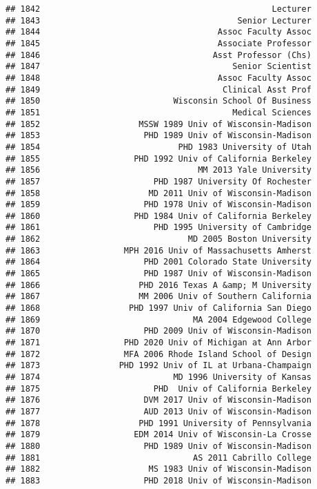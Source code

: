 \documentclass[
]{article}
\begin{document}
\begin{verbatim}
## 1842                                               Lecturer
## 1843                                        Senior Lecturer
## 1844                                    Assoc Faculty Assoc
## 1845                                    Associate Professor
## 1846                                   Asst Professor (Chs)
## 1847                                       Senior Scientist
## 1848                                    Assoc Faculty Assoc
## 1849                                     Clinical Asst Prof
## 1850                           Wisconsin School Of Business
## 1851                                       Medical Sciences
## 1852                    MSSW 1989 Univ of Wisconsin-Madison
## 1853                     PHD 1989 Univ of Wisconsin-Madison
## 1854                            PHD 1983 University of Utah
## 1855                   PHD 1992 Univ of California Berkeley
## 1856                                MM 2013 Yale University
## 1857                       PHD 1987 University Of Rochester
## 1858                      MD 2011 Univ of Wisconsin-Madison
## 1859                     PHD 1978 Univ of Wisconsin-Madison
## 1860                   PHD 1984 Univ of California Berkeley
## 1861                       PHD 1995 University of Cambridge
## 1862                              MD 2005 Boston University
## 1863                 MPH 2016 Univ of Massachusetts Amherst
## 1864                     PHD 2001 Colorado State University
## 1865                     PHD 1987 Univ of Wisconsin-Madison
## 1866                    PHD 2016 Texas A &amp; M University
## 1867                    MM 2006 Univ of Southern California
## 1868                  PHD 1997 Univ of California San Diego
## 1869                               MA 2004 Edgewood College
## 1870                     PHD 2009 Univ of Wisconsin-Madison
## 1871                 PHD 2020 Univ of Michigan at Ann Arbor
## 1872                 MFA 2006 Rhode Island School of Design
## 1873                PHD 1992 Univ of IL at Urbana-Champaign
## 1874                           MD 1996 University of Kansas
## 1875                       PHD  Univ of California Berkeley
## 1876                     DVM 2017 Univ of Wisconsin-Madison
## 1877                     AUD 2013 Univ of Wisconsin-Madison
## 1878                    PHD 1991 University of Pennsylvania
## 1879                   EDM 2014 Univ of Wisconsin-La Crosse
## 1880                     PHD 1989 Univ of Wisconsin-Madison
## 1881                               AS 2011 Cabrillo College
## 1882                      MS 1983 Univ of Wisconsin-Madison
## 1883                     PHD 2018 Univ of Wisconsin-Madison

\end{verbatim}
\end{document}
